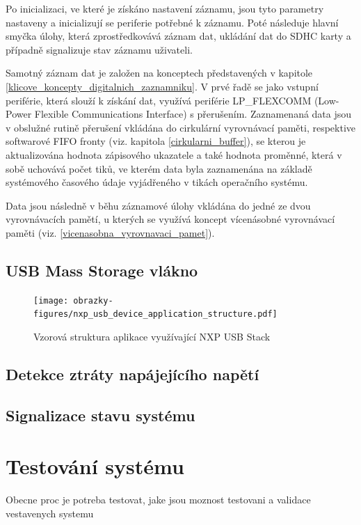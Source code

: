 Po inicializaci, ve které je získáno nastavení záznamu, jsou tyto parametry nastaveny a inicializují se periferie potřebné k záznamu. Poté následuje hlavní smyčka úlohy, která zprostředkovává záznam dat, ukládání dat do SDHC karty a případně signalizuje stav záznamu uživateli.

Samotný záznam dat je založen na konceptech představených v kapitole \ref{klicove_koncepty_digitalnich_zaznamniku}. V prvé řadě se jako vstupní periférie, která slouží k získání dat, využívá periférie LP\_FLEXCOMM (Low-Power Flexible Communications Interface) s přerušením. Zaznamenaná data jsou v obslužné rutině přerušení vkládána do cirkulární vyrovnávací paměti, respektive softwarové FIFO fronty (viz. kapitola \ref{cirkularni_buffer}), se kterou je aktualizována hodnota zápisového ukazatele a také hodnota proměnné, která v sobě uchovává počet tiků, ve kterém data byla zaznamenána na základě systémového časového údaje vyjádřeného v tikách operačního systému.

Data jsou následně v běhu záznamové úlohy vkládána do jedné ze dvou vyrovnávacích pamětí, u kterých se využívá koncept vícenásobné vyrovnávací paměti (viz. \ref{vicenasobna_vyrovnavaci_pamet}).


\section{USB Mass Storage vlákno}


\begin{figure}[h]
    \centering
    \texttt{[image: obrazky-figures/nxp\_usb\_device\_application\_structure.pdf]}
    
    \caption{Vzorová struktura aplikace využívající NXP USB Stack \cite{silicon_labs_mass_storage_protocol}}
    \label{fig:usb-device-app-structure}
\end{figure}

\section{Detekce ztráty napájejícího napětí}

\section{Signalizace stavu systému}

\chapter{Testování systému}
\label{testovani_systemu}
Obecne proc je potreba testovat, jake jsou moznost testovani a validace vestavenych systemu

